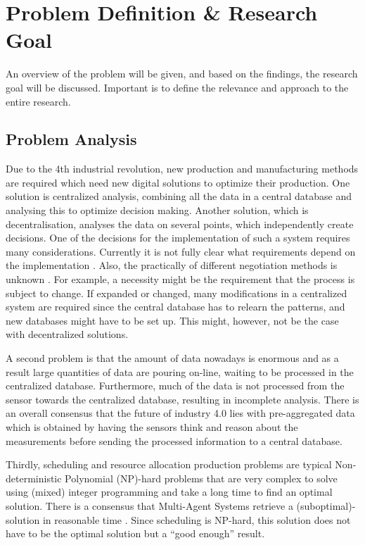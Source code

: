 \chapter{Problem Definition \& Research Goal}
\label{chp:problem}
An overview of the problem will be given, and based on the findings, the research goal will be discussed. Important is to define the relevance and approach to the entire research. 
\section{Problem Analysis}
Due to the 4th industrial revolution, new production and manufacturing methods are required which need new digital solutions to optimize their production. One solution is centralized analysis, combining all the data in a central database and analysing this to optimize decision making. Another solution, which is decentralisation, analyses the data on several points, which independently create decisions. One of the decisions for the implementation of such a system requires many considerations. Currently it is not fully clear what requirements depend on the implementation \citep{leitao2016smart}. Also, the practically of different negotiation methods is unknown \citep{fatima2014principles}. For example, a necessity might be the requirement that the process is subject to change. If expanded or changed, many modifications in a centralized system are required since the central database has to relearn the patterns, and new databases might have to be set up. This might, however, not be the case with decentralized solutions. %

A second problem is that the amount of data nowadays is enormous and as a result large quantities of data are pouring on-line, waiting to be processed in the centralized database. Furthermore, much of the data is not processed from the sensor towards the centralized database, resulting in incomplete analysis. There is an overall consensus that the future of industry 4.0 lies with pre-aggregated data \citep{deloitte2015connected} which is obtained by having the sensors think and reason about the measurements before sending the processed information to a central database.

Thirdly, scheduling and resource allocation production problems are typical Non-deterministic Polynomial (NP)-hard problems that are very complex to solve using (mixed) integer programming and take a long time to find an optimal solution. There is a consensus that Multi-Agent Systems retrieve a (suboptimal)-solution in reasonable time \citep{konolige1980multiple}. Since scheduling is NP-hard, this solution does not have to be the optimal solution but a ``good enough'' result.  

